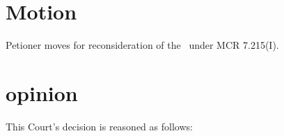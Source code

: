 \documentclass[12pt,\documentclassflag]{michiganCourtOfAppealsBrief}
\begin{document}
\section{Motion}






Petioner moves for reconsideration of the \cite{FOJ}\ under MCR 7.215(I).


\section{opinion}
This Court's decision is reasoned as follows:
\end{document}
